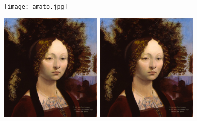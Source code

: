\documentclass[a4paper]{article}
\newif\ifcensored
\begin{document}
\centering
\ifcensored
    \texttt{[image: amato.jpg]}%
\captionof{figure}{censored image}
\else
   \texttt{[image: amato.jpg]}%
\fi
\includegraphics[decodearray=
                                    0.0 0.0
                                    0.0 0.0 
                                    0.0 0.0, width=5cm]{ginerva.png}%
\includegraphics[width=5cm]{ginerva.PNG}%
\end{document}
